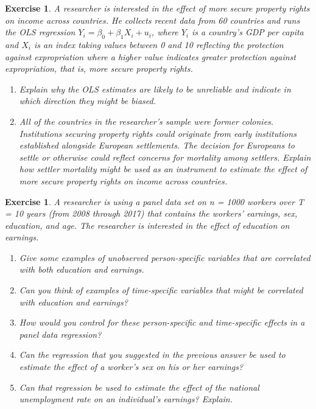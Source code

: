 \documentclass{article}
\newtheorem{exercise}[theorem]{Exercise}
\begin{document}
\begin{exercise} %
A researcher is interested in the effect of more secure property rights on income across countries. He collects recent data from 60 countries and runs the OLS regression $Y_i = \beta_0 + \beta_1 X_i + u_i$, where $Y_i$ is a country’s GDP per capita and $X_i$ is an index taking values between 0 and 10 reflecting the protection
against expropriation where a higher value indicates greater protection against expropriation, that is, more secure property rights.
\begin{enumerate}[label=\alph*)]
    \item Explain why the OLS estimates are likely to be unreliable and indicate in which direction they might be biased.
    \item All of the countries in the researcher’s sample were former colonies. Institutions securing property rights could originate from early institutions established alongside European settlements. The decision for Europeans to settle or otherwise could reflect concerns for mortality among settlers. Explain how settler mortality might be used as an instrument to estimate the effect of more secure property rights on income across countries.
\end{enumerate}
\end{exercise}


\begin{exercise} %
A researcher is using a panel data set on n = 1000 workers over T = 10 years (from 2008 through 2017) that contains the workers’ earnings, sex, education, and age. The researcher is interested in the effect of education on earnings.
\begin{enumerate}[label=\alph*)]
    \item Give some examples of unobserved person-specific variables that are correlated with both education and earnings.
    \item Can you think of examples of time-specific variables that might be correlated with education and earnings?
    \item How would you control for these person-specific and time-specific effects in a panel data regression?
    \item Can the regression that you suggested in the previous answer be used to estimate the effect of a worker’s sex on his or her earnings?
    \item    Can that regression be used to estimate the effect of the national unemployment rate on an individual’s earnings? Explain.
\end{enumerate}
\end{exercise}
\end{document}
